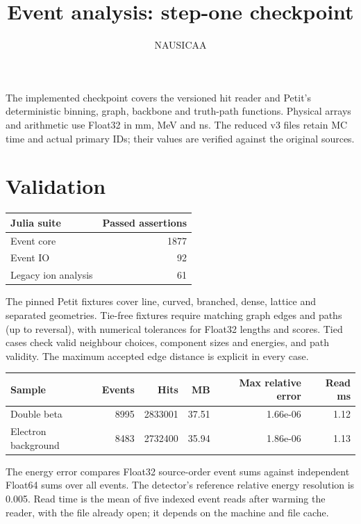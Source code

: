 \documentclass[11pt]{article}
\begin{document}
\title{Event analysis: step-one checkpoint}
\author{NAUSICAA}
\date{}
\maketitle
The implemented checkpoint covers the versioned hit reader and Petit's
deterministic binning, graph, backbone and truth-path functions. Physical arrays
and arithmetic use Float32 in mm, MeV and ns. The reduced v3 files retain MC time
and actual primary IDs; their values are verified against the original sources.

\section*{Validation}
\begin{center}\begin{tabular}{lr}\toprule
Julia suite & Passed assertions \\\midrule
Event core & 1877 \\
Event IO & 92 \\
Legacy ion analysis & 61 \\
\bottomrule\end{tabular}\end{center}
The pinned Petit fixtures cover line, curved, branched, dense, lattice and
separated geometries. Tie-free fixtures require matching graph edges and paths
(up to reversal), with numerical tolerances for Float32 lengths and scores.
Tied cases check valid neighbour choices, component sizes and energies, and
path validity. The maximum accepted edge distance is explicit in every case.

\begin{center}\small\begin{tabular}{lrrrrr}\toprule
Sample & Events & Hits & MB & Max relative error & Read ms \\\midrule
Double beta & 8995 & 2833001 & 37.51 & 1.66e-06 & 1.12 \\
Electron background & 8483 & 2732400 & 35.94 & 1.86e-06 & 1.13 \\
\bottomrule\end{tabular}\end{center}
The energy error compares Float32 source-order event sums against independent
Float64 sums over all events. The detector's reference relative energy resolution
is 0.005. Read time is the mean of five indexed event reads after warming the
reader, with the file already open; it depends on the machine and file cache.
\end{document}
